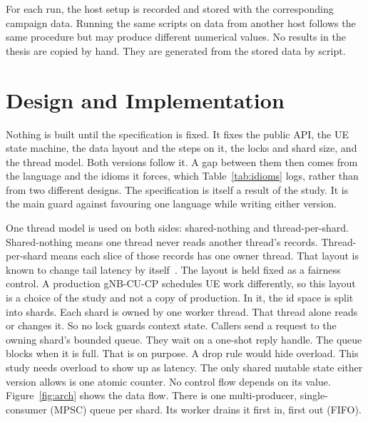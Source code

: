 \documentclass[english,oneside,a4paper,censored,csm,software-track-2020]{HYthesisML}
\begin{document}
For each run, the host setup is recorded and stored with the corresponding campaign data.
Running the same scripts on data from another host follows the same procedure but may
produce different numerical values. No results in the thesis are copied by hand. They are
generated from the stored data by script.
\chapter{Design and Implementation\label{chapter:design}}

Nothing is built until the specification is fixed. It fixes the public API, the UE
state machine, the data layout and the steps on it, the locks and shard size,
and the thread model. Both versions follow it. A gap between them then comes
from the language and the idioms it forces, which Table~\ref{tab:idioms} logs,
rather than from two different designs. The specification is itself a result of
the study. It is the main guard against favouring one language while writing either version.

One thread model is used on both sides: shared-nothing and thread-per-shard.
Shared-nothing means one thread never reads another thread’s records. Thread-per-shard means
each slice of those records has one owner thread.
That layout is known to change tail latency by
itself~\cite{enberg2019threadpercore}. The layout is held fixed as a fairness
control. A production gNB-CU-CP schedules UE work differently, so this layout is a choice
of the study and not a copy of production. In it, the id space is split into shards. Each
shard is owned by one worker thread. That thread alone reads or changes it.
So no lock guards context state. Callers send a request to the owning shard's
bounded queue. They wait on a one-shot reply handle. The queue blocks when it
is full. That is on purpose. A drop rule would hide overload. This study needs
overload to show up as latency. The only shared mutable state either version
allows is one atomic counter. No control flow depends on its value.
Figure~\ref{fig:arch} shows the data flow. There is one multi-producer,
single-consumer (MPSC) queue per shard. Its worker drains it first in, first
out (FIFO).
\end{document}
